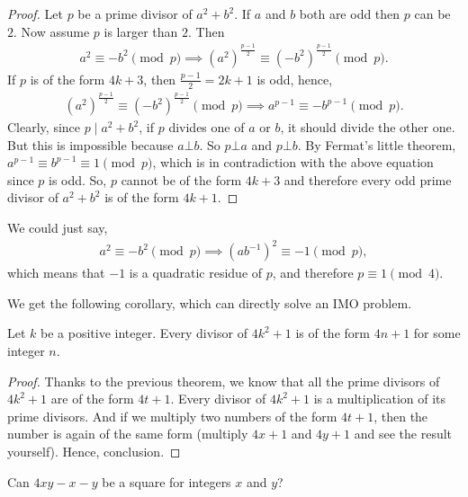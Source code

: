\documentclass[main.tex]{subfile}
\begin{document}
	\begin{proof}
		Let $p$ be a prime divisor of $a^2+b^2$. If $a$ and $b$ both are odd then $p$ can be $2$. Now assume $p$ is larger than $2$. Then
			\begin{align*}
				a^2  \equiv-b^2 \pmod p\implies \left(a^2\right)^{\frac{p-1}{2}} \equiv \left(-b^2\right)^{\frac{p-1}{2}}\pmod p.
			\end{align*}
		If $p$ is of the form $4k+3$, then $\frac{p-1}{2}=2k+1$ is odd, hence,
			\begin{align*}
			\left(a^2\right)^{\frac{p-1}{2}} \equiv \left(-b^2\right)^{\frac{p-1}{2}}\pmod p \implies a^{p-1} \equiv -b^{p-1} \pmod p.
			\end{align*}
		Clearly, since $p\mid a^2+b^2$, if $p$ divides one of $a$ or $b$, it should divide the other one. But this is impossible because $a \bot b$. So $p \bot a$ and $p \bot b$. By Fermat's little theorem, $a^{p-1} \equiv b^{p-1} \equiv 1 \pmod p$, which is in contradiction with the above equation since $p$ is odd.
		So, $p$ cannot be of the form $4k+3$ and therefore every odd prime divisor of $a^2+b^2$ is of the form $4k+1$.
	\end{proof}
	
	\begin{note}
	We could just say,
			\begin{align*}
				a^2  \equiv-b^2\pmod p \implies (ab^{-1})^2 \equiv-1\pmod p,
			\end{align*}
		which means that $-1$ is a quadratic residue of $p$, and therefore $p\equiv1\pmod4$.
	\end{note}
We get the following corollary, which can directly solve an IMO problem.
	\begin{corollary}\label{cor:4n+1}
		Let $k$ be a positive integer. Every divisor of $4k^2+1$ is of the form $4n+1$ for some integer $n$.
	\end{corollary}
	
	\begin{proof}
		Thanks to the previous theorem, we know that all the prime divisors of $4k^2+1$ are of the form $4t+1$. Every divisor of $4k^2+1$ is a multiplication of its prime divisors. And if we multiply two numbers of the form $4t+1$, then the number is again of the same form (multiply $4x+1$ and $4y+1$ and see the result yourself). Hence, conclusion.
	\end{proof}
	
	\begin{problem}
		Can $4xy-x-y$ be a square for integers $x$ and $y$?
	\end{problem}
	
\end{document}
